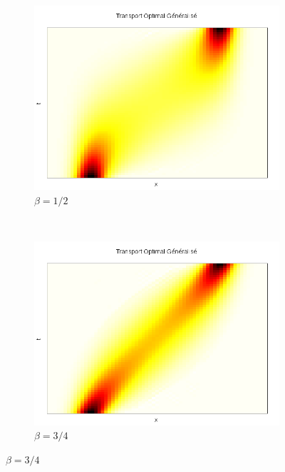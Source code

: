 \documentclass{beamer}
\begin{document}
\begin{frame}
\begin{figure}[!h]
	\begin{subfigure}[b]{0.48\linewidth}
	\includegraphics[width=\textwidth]{img/1DGeneralise/transport50.png}
	\caption{$\beta = 1/2$}
	\end{subfigure}
	~
	\begin{subfigure}[b]{0.48\linewidth}
	\includegraphics[width=\textwidth]{img/1DGeneralise/transport75.png}
	\caption{$\beta = 3/4$}
	\end{subfigure}	
\end{figure}
\end{frame}
\end{document}
